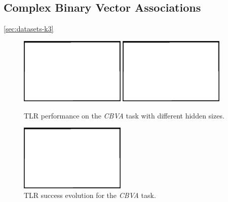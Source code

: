 
\subsection{Complex Binary Vector Associations} 
\label{sec:tlr-k3}

\ref{sec:datasets-k3} 


\begin{figure}[H]
  \centering
  \includegraphics[width=0.45\textwidth]{img/placeholder.png}   
  \includegraphics[width=0.45\textwidth]{img/placeholder.png}    
  \caption{TLR performance on the \emph{CBVA} task with different hidden sizes.}
  \label{fig:results-tlr-k3-success}
\end{figure}

\begin{figure}[H]
  \centering
  \includegraphics[width=0.45\textwidth]{img/placeholder.png}    
  \caption{TLR success evolution for the \emph{CBVA} task.}
  \label{fig:results-tlr-k3-epoch} 
\end{figure}
